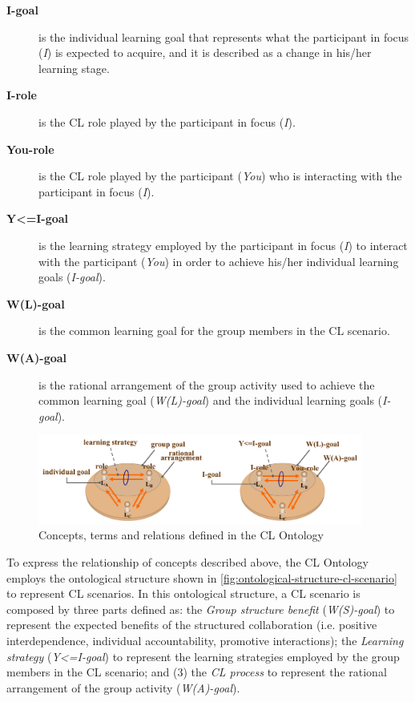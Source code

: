 \begin{description}
 \item[\textbf{I-goal}] is the individual learning goal that represents what the participant in focus (\emph{I}) is expected to acquire, and it is described as a change in his/her learning stage.

 \item[\textbf{I-role}] is the CL role played by the participant in focus (\emph{I}).

 \item[\textbf{You-role}] is the CL role played by the participant (\emph{You}) who is interacting with the participant in focus (\emph{I}).

 \item[\textbf{Y<=I-goal}] is the learning strategy employed by the participant in focus (\emph{I}) to interact with the participant (\emph{You}) in order to achieve his/her individual learning goals (\emph{I-goal}).

 \item[\textbf{W(L)-goal}] is the common learning goal for the group members in the CL scenario.

 \item[\textbf{W(A)-goal}] is the rational arrangement of the group activity used to achieve the common learning goal (\emph{W(L)-goal}) and the individual learning goals (\emph{I-goal}).
\end{description}

\begin{figure}[htb]
 \caption{Concepts, terms and relations defined in the CL Ontology}
 \label{fig:concepts-terms-and-relation-in-cl-ontology}
 \centering
 \includegraphics[width=0.95\textwidth]{images/chap-ontogacles1/concepts-terms-and-relation-in-cl-ontology.png}
\end{figure}

To express the relationship of concepts described above, the CL Ontology employs the ontological structure shown in \autoref{fig:ontological-structure-cl-scenario} to represent CL scenarios. In this ontological structure, a CL scenario is composed by three parts defined as:  the \emph{Group structure benefit} (\emph{W(S)-goal}) to represent the expected benefits of the structured collaboration (i.e. positive interdependence, individual accountability, promotive interactions); the \emph{Learning strategy} (\emph{Y<=I-goal}) to represent the learning strategies employed by the group members in the CL scenario; and (3) the \emph{CL process} to represent the rational arrangement of the group activity (\emph{W(A)-goal}).

